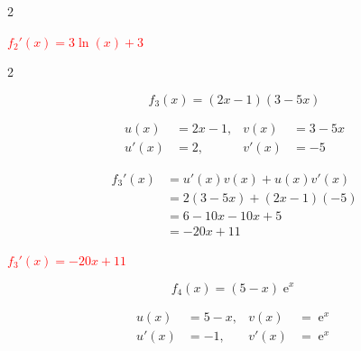 \documentclass[11pt,a4paper]{article}
\DeclareMathOperator{\e}{e}
\begin{document}
\begin{multicols}{2}
\begin{tcolorbox}[colback=red!5!white,colframe=red!75!black]
{\begin{center}
    


\textbf{\textcolor{red}{$f_2'(x) = 3\ln(x) + 3$}}

\end{center}

\vspace{24mm}

}
\end{tcolorbox}
\end{multicols}



\begin{multicols}{2}
\begin{tcolorbox}[colback=red!5!white,colframe=red!75!black]
{
\[
f_3(x) = (2x-1)(3-5x)
\]

\vspace{4mm}

\[
\begin{aligned}
u(x) &= 2x-1, & v(x) &= 3-5x \\
u'(x) &= 2, & v'(x) &= -5
\end{aligned}
\]

\vspace{4mm}


\[
\begin{aligned}
    f_3'(x) & = u'(x)v(x) + u(x)v'(x)  \\
            & = 2(3-5x) + (2x-1)(-5) \\
            & = 6-10x -10x+5 \\
            & = -20x + 11
\end{aligned}
\]

\vspace{4mm}


\begin{center}
\textbf{\textcolor{red}{$f_3'(x) = -20x + 11$}}
\end{center}

\vspace{24mm}


}
\end{tcolorbox}

\begin{tcolorbox}[colback=red!5!white,colframe=red!75!black]
{
\[
f_4(x) = (5-x)\e^x
\]

\vspace{4mm}


\[
\begin{aligned}
u(x) &= 5-x, & v(x) &= \e^x \\
u'(x) &= -1, & v'(x) &= \e^x
\end{aligned}
\]

}
\end{tcolorbox}
\end{multicols}
\end{document}
